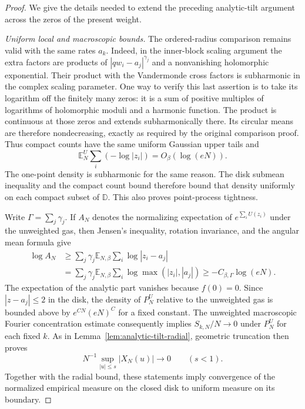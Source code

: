 \documentclass[11pt,a4paper]{article}
\numberwithin{equation}{section}
\theoremstyle{definition}
\theoremstyle{remark}
\newcommand{\D}{\mathbb D}
\begin{document}
\begin{proof}
We give the details needed to extend the preceding analytic-tilt argument
across the zeros of the present weight.

\emph{Uniform local and macroscopic bounds.}
The ordered-radius comparison remains valid with the same rates $a_k$.
Indeed, in the inner-block scaling argument the extra factors are
products of $|qw_i-a_j|^{\gamma_j}$ and a nonvanishing holomorphic
exponential. Their product with the Vandermonde cross factors is
subharmonic in the complex scaling parameter. One way to verify this
last assertion is to take its logarithm off the finitely many zeros:
it is a sum of positive multiples of logarithms of holomorphic moduli
and a harmonic function. The product is continuous at those zeros and
extends subharmonically there. Its circular means are therefore
nondecreasing, exactly as required by the original comparison proof.
Thus compact counts have the same uniform Gaussian upper tails and
\[
 \mathbb E_N^U\sum_i(-\log|z_i|)=O_\beta(\log(eN)).
\]
The one-point density is subharmonic for the same reason. The disk
submean inequality and the compact count bound therefore bound that
density uniformly on each compact subset of $\D$. This also proves
point-process tightness.

Write $\Gamma=\sum_j\gamma_j$. If $A_N$ denotes the normalizing
expectation of $e^{\sum_iU(z_i)}$ under the unweighted gas, then Jensen's
inequality, rotation invariance, and the angular mean formula give
\begin{align*}
 \log A_N
 &\geq\sum_j\gamma_j\mathbb E_{N,\beta}\sum_i\log|z_i-a_j|\\
 &=\sum_j\gamma_j\mathbb E_{N,\beta}\sum_i
                          \log\max(|z_i|,|a_j|)
 \geq-C_{\beta,\Gamma}\log(eN).
\end{align*}
The expectation of the analytic part vanishes because $f(0)=0$.
Since $|z-a_j|\leq2$ in the disk, the density of $P_N^U$ relative to the
unweighted gas is bounded above by $e^{CN}(eN)^C$ for a fixed constant.
The unweighted macroscopic Fourier concentration estimate consequently
implies $S_{k,N}/N\to0$ under $P_N^U$ for each fixed $k$. As in
Lemma~\ref{lem:analytic-tilt-radial}, geometric truncation then proves
\[
 N^{-1}\sup_{|u|\leq s}|X_N(u)|\to0\qquad(s<1).
\]
Together with the radial bound, these statements imply convergence of
the normalized empirical measure on the closed disk to uniform measure
on its boundary.


\end{proof}
\end{document}
